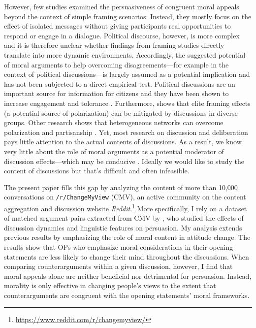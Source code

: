 However, few studies examined the persuasiveness of congruent moral appeals beyond the context of simple framing scenarios. Instead, they mostly focus on the effect of isolated messages without giving participants real opportunities to respond or engage in a dialogue. Political discourse, however, is more complex and it is therefore unclear whether findings from framing studies directly translate into more dynamic environments. Accordingly, the suggested potential of moral arguments to help overcoming disagreements---for example in the context of political discussions---is largely assumed as a potential implication and has not been subjected to a direct empirical test. Political discussions are an important source for information for citizens \citep{huckfeldt1995political} and they have been shown to increase engagement and tolerance \citep{mutz2002cross}. Furthermore, \citet{druckman2003framing} shows that elite framing effects (a potential source of polarization) can be mitigated by discussions in diverse groups. Other research shows that heterogeneous networks can overcome polarization and partisanship \citep{klar2014partisanship}. Yet, most research on discussion and deliberation pays little attention to the actual contents of discussions. As a result, we know very little about the role of moral arguments as a potential moderator of discussion effects---which may be conducive . Ideally we would like to study the content of discussions but that's difficult and often infeasible. 

The present paper fills this gap by analyzing the content of more than 10,000 conversations on \texttt{/r/ChangeMyView} (CMV), an active community on the content aggregation and discussion website \textit{Reddit}.\footnote{\url{https://www.reddit.com/r/changemyview/}} More specifically, I rely on a dataset of matched argument pairs extracted from CMV by \citet{tan2016winning}, who studied the effects of discussion dynamics and linguistic features on persuasion. My analysis extends previous results by emphasizing the role of moral content in attitude change. The results show that OPs who emphasize moral considerations in their opening statements are less likely to change their mind throughout the discussions. When comparing counterarguments within a given discussion, however, I find that moral appeals alone are neither beneficial nor detrimental for persuasion. Instead, morality is only effective in changing people's views to the extent that counterarguments are congruent with the opening statements' moral frameworks.

